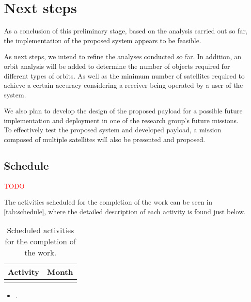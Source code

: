 %
%
%
%
%

%
%
%
%
%

\chapter{Next steps} \label{ch:conclusion}

As a conclusion of this preliminary stage, based on the analysis carried out so far, the implementation of the proposed system appears to be feasible.

As next steps, we intend to refine the analyses conducted so far. In addition, an orbit analysis will be added to determine the number of objects required for different types of orbits. As well as the minimum number of satellites required to achieve a certain accuracy considering a receiver being operated by a user of the system.

We also plan to develop the design of the proposed payload for a possible future implementation and deployment in one of the research group's future missions. To effectively test the proposed system and developed payload, a mission composed of multiple satellites will also be presented and proposed.


\section{Schedule}

\textcolor{red}{TODO}

The activities scheduled for the completion of the work can be seen in \autoref{tab:schedule}, where the detailed description of each activity is found just below.

\begin{table}[!ht]
    \centering
    \begin{tabular}{lc}
        \toprule[1.5pt]
        \textbf{Activity} & \textbf{Month} \\
        \midrule
        & \\
        \bottomrule[1.5pt]
    \end{tabular}
    \caption{Scheduled activities for the completion of the work.}
    \label{tab:schedule}
\end{table}

\begin{itemize}
    \item .
\end{itemize}